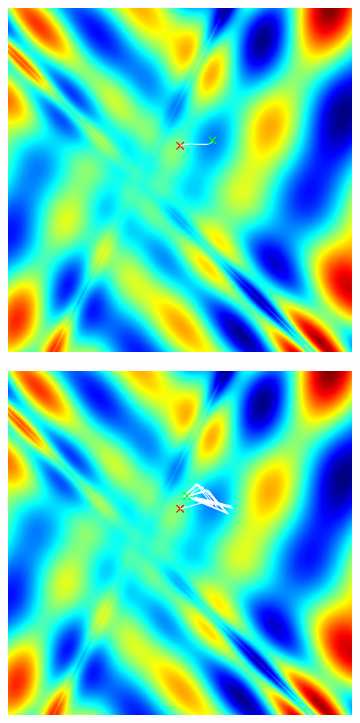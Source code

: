 \documentclass[sigconf,nonacm]{acmart}
\begin{document}
\begin{figure}[h]
  \begin{subfigure}[c]{0.3\columnwidth}
    \includegraphics[width=\textwidth]{local-minimum.png}
  \end{subfigure}
  \hspace{1pt}
  \begin{subfigure}[c]{0.3\columnwidth}
    \includegraphics[width=\textwidth]{oscillation.png}

\end{subfigure}
\end{figure}
\end{document}
